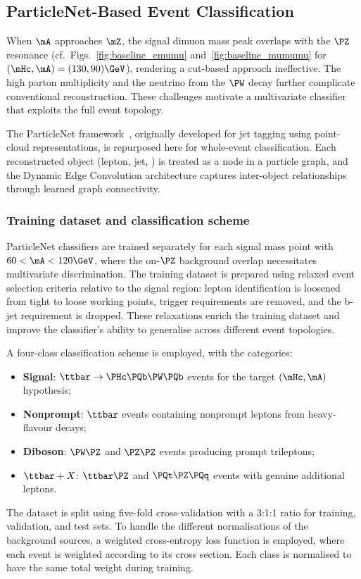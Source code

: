 \subsection{ParticleNet-Based Event Classification}
\label{ssec:particlenet}

When $\mA$ approaches $\mZ$, the signal dimuon mass peak overlaps with the $\PZ$ resonance (cf.\ Figs.~\ref{fig:baseline_emumu} and~\ref{fig:baseline_mumumu} for $(\mHc, \mA) = (130, 90)\GeV$), rendering a cut-based approach ineffective. The high parton multiplicity and the neutrino from the $\PW$ decay further complicate conventional reconstruction. These challenges motivate a multivariate classifier that exploits the full event topology.

The ParticleNet framework~\cite{ParticleNet}, originally developed for jet tagging using point-cloud representations, is repurposed here for whole-event classification. Each reconstructed object (lepton, jet, \ptmiss) is treated as a node in a particle graph, and the Dynamic Edge Convolution architecture captures inter-object relationships through learned graph connectivity.

\subsubsection{Training dataset and classification scheme}

ParticleNet classifiers are trained separately for each signal mass point with $60 < \mA < 120\GeV$, where the on-$\PZ$ background overlap necessitates multivariate discrimination. The training dataset is prepared using relaxed event selection criteria relative to the signal region: lepton identification is loosened from tight to loose working points, trigger requirements are removed, and the b-jet requirement is dropped. These relaxations enrich the training dataset and improve the classifier's ability to generalise across different event topologies.

A four-class classification scheme is employed, with the categories:
\begin{itemize}
\item \textbf{Signal}: $\ttbar \to \PHc\PQb\PW\PQb$ events for the target $(\mHc, \mA)$ hypothesis;
\item \textbf{Nonprompt}: $\ttbar$ events containing nonprompt leptons from heavy-flavour decays;
\item \textbf{Diboson}: $\PW\PZ$ and $\PZ\PZ$ events producing prompt trileptons;
\item \textbf{$\ttbar+X$}: $\ttbar\PZ$ and $\PQt\PZ\PQq$ events with genuine additional leptons.
\end{itemize}
The dataset is split using five-fold cross-validation with a 3:1:1 ratio for training, validation, and test sets. To handle the different normalisations of the background sources, a weighted cross-entropy loss function is employed, where each event is weighted according to its cross section. Each class is normalised to have the same total weight during training.

